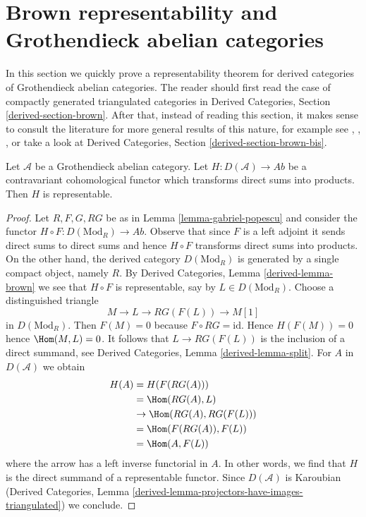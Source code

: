 \section{Brown representability and Grothendieck abelian categories}
\label{section-brown}

\noindent
In this section we quickly prove a representability theorem for
derived categories of Grothendieck abelian categories. The reader should
first read the case of compactly generated triangulated categories in
Derived Categories, Section \ref{derived-section-brown}.
After that, instead of reading this section,
it makes sense to consult the literature for more
general results of this nature, for example see
\cite{Franke}, \cite{Neeman}, \cite{Krause}, or take
a look at Derived Categories, Section \ref{derived-section-brown-bis}.

\begin{lemma}
\label{lemma-brown}
Let $\mathcal{A}$ be a Grothendieck abelian category.
Let $H : D(\mathcal{A}) \to \textit{Ab}$ be a contravariant
cohomological functor which transforms direct sums into products.
Then $H$ is representable.
\end{lemma}

\begin{proof}
Let $R, F, G, RG$ be as in Lemma \ref{lemma-gabriel-popescu}
and consider the functor $H \circ F : D(\text{Mod}_R) \to \textit{Ab}$.
Observe that since $F$ is a left adjoint it sends direct sums to
direct sums and hence $H \circ F$ transforms direct sums into products.
On the other hand, the derived category $D(\text{Mod}_R)$ is
generated by a single compact object, namely $R$.
By Derived Categories, Lemma \ref{derived-lemma-brown}
we see that $H \circ F$ is representable, say by $L \in D(\text{Mod}_R)$.
Choose a distinguished triangle
$$
M \to L \to RG(F(L)) \to M[1]
$$
in $D(\text{Mod}_R)$. Then $F(M) = 0$ because $F \circ RG = \text{id}$.
Hence $H(F(M)) = 0$ hence $\Hom(M, L) = 0$.
It follows that $L \to RG(F(L))$ is the inclusion of a direct summand, see
Derived Categories, Lemma \ref{derived-lemma-split}.
For $A$ in $D(\mathcal{A})$ we obtain
\begin{align*}
H(A)
& =
H(F(RG(A))) \\
& =
\Hom(RG(A), L) \\
& \to
\Hom(RG(A), RG(F(L))) \\
& =
\Hom(F(RG(A)), F(L)) \\
& =
\Hom(A, F(L))
\end{align*}
where the arrow has a left inverse functorial in $A$. In other words, we find
that $H$ is the direct summand of a representable functor.
Since $D(\mathcal{A})$ is Karoubian
(Derived Categories, Lemma
\ref{derived-lemma-projectors-have-images-triangulated}) we conclude.
\end{proof}

